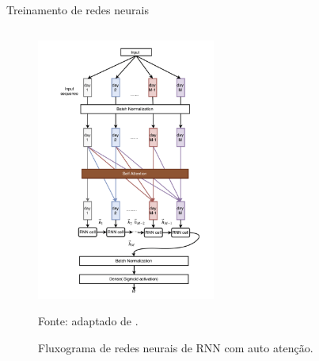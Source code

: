     \begin{frame}{Treinamento de redes neurais}


        
        \begin{columns}
            \begin{column}{0.5\textwidth}

                \begin{figure}[htp]
                    \centering
                    \caption{Fluxograma de redes neurais de RNN com auto atenção.}
                    \label{fig:RNN_SelfAtt}
                    \includegraphics[width=0.55\textwidth]{./images/RNN_SelfAtt.png}
                    \par \footnotesize Fonte: adaptado de \citeauthor{cao2020delafo}.
                \end{figure}


            \end{column}

            \begin{column}{0.5\textwidth}


\end{column}
\end{columns}
\end{frame}
